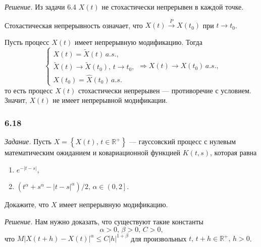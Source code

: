 \textit{Решение.}
Из задачи 6.4 $X \left( t \right) $ не стохастически непрерывен в каждой точке.

Стохастическая непрерывность означает,
что $X \left( t \right) \overset{P}{ \to } X \left( t_0 \right) $ при $t \to t_0$.

Пусть процесс $X \left( t \right) $ имеет непрерывную модификацию.
Тогда
$$ \begin{cases}
    X \left( t \right) = \tilde{X} \left( t \right) \, a.s., \\
    \tilde{X} \left( t \right) \to \tilde{X} \left( t_0 \right), \, t \to t_0, \\
    X \left( t_0 \right) = \hat{X} \left( t_0 \right) \, a.s.
  \end{cases} \Rightarrow X \left( t \right) \to X \left( t_0 \right) \, a.s.,$$
то есть процесс $X \left( t \right) $ стохастически непрерывен --- противоречие с условием.
Значит, $X \left( t \right) $ не имеет непрерывной модификации.

\subsubsection*{6.18}

\textit{Задание.}
Пусть $X = \left\{ X \left( t \right), \, t \in \mathbb{R}^+ \right\} $ ---
гауссовский процесс с нулевым математическим ожиданием и ковариационной функцией
$K \left( t, s \right) $, которая равна
\begin{enumerate}[label=\alph*)]
  \item $e^{-\left| t - s \right| }$,
  \item $ \left( t^{ \alpha } + s^{ \alpha } - \left| t - s \right|^{ \alpha } \right) / 2, \,
    \alpha \in \left( 0, 2 \right] $.
\end{enumerate}
Докажите, что $X$ имеет непрерывную модификацию.

\textit{Решение.}
Нам нужно доказать, что существуют такие константы
$$ \alpha > 0, \,
  \beta > 0, \,
  C > 0,$$
что
$M \left| X \left( t + h \right) - X \left( t \right) \right|^{ \alpha} \leq
  C \left| h \right|^{1 + \beta }$
для произвольных $t, \, t + h \in \mathbb{R}^+, \, h > 0$.

